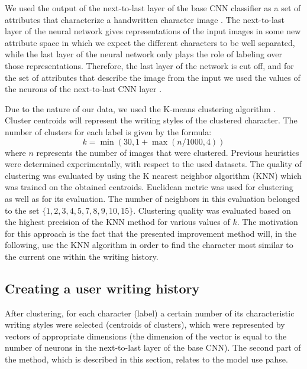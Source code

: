 \documentclass{article}
\begin{document}
We used the output of the next-to-last layer of the base CNN classifier as a set of attributes that characterize a handwritten character image \citet{nexttolast}. 
The next-to-last layer of the neural network gives representations of the input images in some new attribute space in which we expect the different characters to be well separated, 
while the last layer of the neural network only plays the role of labeling over those representations. 
Therefore, the last layer of the network is cut off, and for the set of attributes that describe the image from the input we used the values of the neurons of the next-to-last CNN layer \citet{style1} \citet{style2}. 

Due to the nature of our data, we used the K-means clustering algorithm \citet{kmeans}. 
Cluster centroids will represent the writing styles of the clustered character. 
The number of clusters for each label is given by the formula: 
\begin{equation}
  k = \min(30, 1+\max(n/1000, 4))
\end{equation}
where $n$ represents the number of images that were clustered. 
Previous heuristics were determined experimentally, with respect to the used datasets. 
The quality of clustering was evaluated by using the K nearest neighbor algorithm (KNN) which was trained on the obtained centroids. 
Euclidean metric was used for clustering as well as for its evaluation. 
The number of neighbors in this evaluation belonged to the set $\{1,2,3,4,5,7,8,9,10,15\}$. 
Clustering quality was evaluated based on the highest precision of the KNN method for various values of $k$. 
The motivation for this approach is the fact that the presented improvement method will, in the following, use the KNN algorithm in order to find the character most similar to the current one within the writing history. 

\subsection{Creating a user writing history}

After clustering, for each character (label) a certain number of its characteristic writing styles were selected (centroids of clusters), which were represented by vectors of appropriate dimensions 
(the dimension of the vector is equal to the number of neurons in the next-to-last layer of the base CNN). 
The second part of the method, which is described in this section, relates to the model use pahse. 
\end{document}
